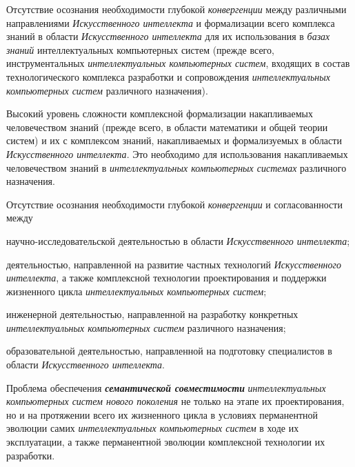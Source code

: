 \begin{textitemize}
	\item 
	Отсутствие осознания необходимости глубокой \textit{конвергенции} между различными направлениями \textit{Искусственного интеллекта} и формализации всего комплекса знаний в области \textit{Искусственного интеллекта} для их использования в \textit{базах знаний} интеллектуальных компьютерных систем (прежде всего, инструментальных \textit{интеллектуальных компьютерных систем}, входящих в состав технологического комплекса разработки и сопровождения \textit{интеллектуальных компьютерных систем} различного назначения).
	
	\item 
	Высокий уровень сложности комплексной формализации  накапливаемых человечеством знаний (прежде всего, в области математики и общей теории систем) и их  с комплексом знаний, накапливаемых и формализуемых в области \textit{Искусственного интеллекта}. Это необходимо для  использования накапливаемых человечеством знаний в \textit{интеллектуальных компьютерных системах} различного назначения.
	
	\item 
	Отсутствие осознания необходимости глубокой \textit{конвергенции} и согласованности между
	\begin{textitemize}
		\item научно-исследовательской деятельностью в области \textit{Искусственного интеллекта};
		\item деятельностью, направленной на развитие частных технологий \textit{Искусственного интеллекта}, а также комплексной технологии проектирования и поддержки жизненного цикла \textit{интеллектуальных компьютерных систем};
		\item инженерной деятельностью, направленной на разработку конкретных \textit{интеллектуальных компьютерных систем} различного назначения;
		\item образовательной деятельностью, направленной на подготовку специалистов в области \textit{Искусственного интеллекта}.
	\end{textitemize}
	\item 
	Проблема обеспечения \textbf{\textit{семантической совместимости}} \textit{интеллектуальных компьютерных систем нового поколения} не только на этапе их проектирования, но и на протяжении всего их жизненного цикла в условиях перманентной эволюции самих \textit{интеллектуальных компьютерных систем} в ходе их эксплуатации, а также перманентной эволюции комплексной технологии их разработки.
\end{textitemize}

